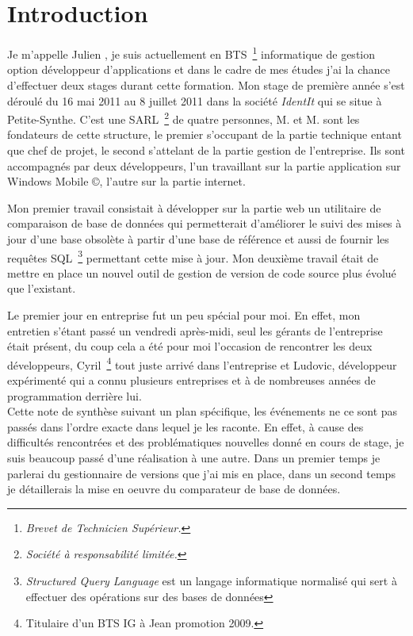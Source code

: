 \chapter{Introduction}

Je m'appelle Julien , je suis actuellement en BTS\,
\footnote{\emph{Brevet de Technicien Supérieur.}} informatique de gestion
option développeur d'applications et dans le cadre de mes études j'ai la chance
d'effectuer deux stages durant cette formation. Mon stage de première année s'est déroulé du 16 mai 2011 au 8 juillet 2011 dans la société \emph{IdentIt}
qui se situe à Petite-Synthe. C'est une SARL\, \footnote{\emph{Société à
responsabilité limitée.}} de quatre personnes, M. et
M. sont les fondateurs de cette structure, le premier s'occupant de
la partie technique entant que chef de projet, le second s'attelant de la
partie gestion de l'entreprise. Ils sont accompagnés par deux développeurs,
l'un travaillant sur la partie application sur Windows Mobile \copyright,
l'autre sur la partie internet.

Mon premier travail consistait à développer sur la partie web un utilitaire de
comparaison de base de données qui permetterait d'améliorer le suivi des mises
à jour d'une base obsolète à partir d'une base de référence et aussi de fournir
les requêtes SQL\, \footnote{\emph{Structured Query Language} est un langage
informatique normalisé qui sert à effectuer des opérations sur des bases de
données} permettant cette mise à jour. Mon deuxième travail était de mettre en
place un nouvel outil de gestion de version de code source plus évolué que
l'existant.

Le premier jour en entreprise fut un peu spécial pour moi. En effet, mon
entretien s'étant passé un vendredi après-midi, seul les gérants de
l'entreprise était présent, du coup cela a été pour moi l'occasion de
rencontrer les deux développeurs, Cyril\, \footnote{Titulaire d'un BTS IG à
Jean  promotion 2009.} tout juste arrivé dans l'entreprise et
Ludovic, développeur expérimenté qui a connu plusieurs entreprises et à de
nombreuses années de programmation derrière lui.\\ Cette note de synthèse
suivant un plan spécifique, les événements ne ce sont pas passés dans l'ordre
exacte dans lequel je les raconte. En effet, à cause des difficultés
rencontrées et des problématiques nouvelles donné en cours de stage, je suis
beaucoup passé d'une réalisation à une autre. Dans un premier temps je parlerai
du gestionnaire de versions que j'ai mis en place, dans un second temps je
détaillerais la mise en oeuvre du comparateur de base de données.

\clearpage
